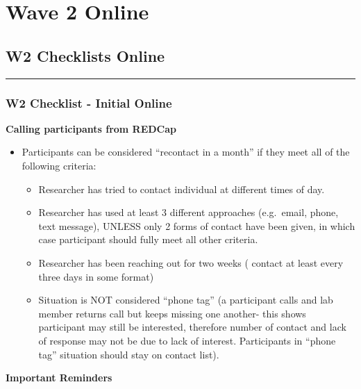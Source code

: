 \documentclass[]{book}
\providecommand{\tightlist}{%
  \setlength{\itemsep}{0pt}\setlength{\parskip}{0pt}}
\begin{document}
\hypertarget{wave-2-online}{%
\chapter{Wave 2 Online}\label{wave-2-online}}

\hypertarget{w2-checklists-online}{%
\section{W2 Checklists Online}\label{w2-checklists-online}}

\begin{center}\rule{0.5\linewidth}{0.5pt}\end{center}

\hypertarget{w2-checklist---initial-online}{%
\subsection{W2 Checklist - Initial Online}\label{w2-checklist---initial-online}}

\textbf{Calling participants from REDCap}

\begin{itemize}
\tightlist
\item
  Participants can be considered ``recontact in a month'' if they meet all of the following criteria:

  \begin{itemize}
  \tightlist
  \item
    Researcher has tried to contact individual at different times of day.
  \item
    Researcher has used at least 3 different approaches (e.g.~email, phone, text message), UNLESS only 2 forms of contact have been given, in which case participant should fully meet all other criteria.
  \item
    Researcher has been reaching out for two weeks ( contact at least every three days in some format)\\
  \item
    Situation is NOT considered ``phone tag'' (a participant calls and lab member returns call but keeps missing one another- this shows participant may still be interested, therefore number of contact and lack of response may not be due to lack of interest. Participants in ``phone tag'' situation should stay on contact list).
  \end{itemize}
\end{itemize}

\textbf{Important Reminders}
\end{document}
